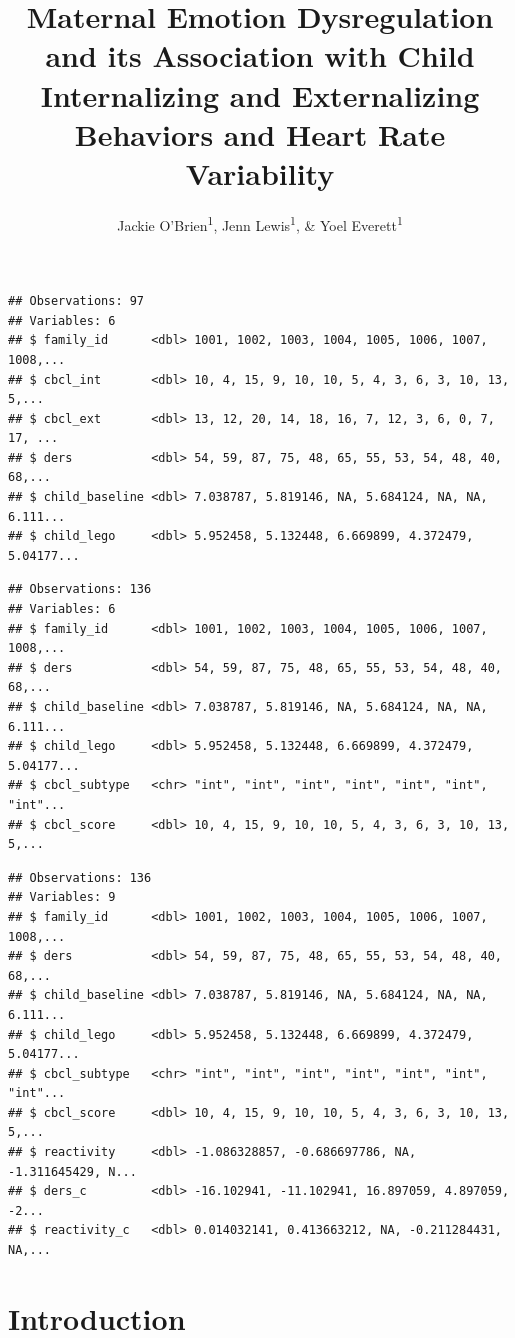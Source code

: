 \documentclass[man]{apa6}
\title{Maternal Emotion Dysregulation and its Association with Child
Internalizing and Externalizing Behaviors and Heart Rate Variability}
\author{Jackie O'Brien\textsuperscript{1}, Jenn Lewis\textsuperscript{1}, \&
Yoel Everett\textsuperscript{1}}
\date{}
\affiliation{
\vspace{0.5cm}
\textsuperscript{1} University of Oregon}
\begin{document}
\maketitle

\begin{verbatim}
## Observations: 97
## Variables: 6
## $ family_id      <dbl> 1001, 1002, 1003, 1004, 1005, 1006, 1007, 1008,...
## $ cbcl_int       <dbl> 10, 4, 15, 9, 10, 10, 5, 4, 3, 6, 3, 10, 13, 5,...
## $ cbcl_ext       <dbl> 13, 12, 20, 14, 18, 16, 7, 12, 3, 6, 0, 7, 17, ...
## $ ders           <dbl> 54, 59, 87, 75, 48, 65, 55, 53, 54, 48, 40, 68,...
## $ child_baseline <dbl> 7.038787, 5.819146, NA, 5.684124, NA, NA, 6.111...
## $ child_lego     <dbl> 5.952458, 5.132448, 6.669899, 4.372479, 5.04177...
\end{verbatim}

\begin{verbatim}
## Observations: 136
## Variables: 6
## $ family_id      <dbl> 1001, 1002, 1003, 1004, 1005, 1006, 1007, 1008,...
## $ ders           <dbl> 54, 59, 87, 75, 48, 65, 55, 53, 54, 48, 40, 68,...
## $ child_baseline <dbl> 7.038787, 5.819146, NA, 5.684124, NA, NA, 6.111...
## $ child_lego     <dbl> 5.952458, 5.132448, 6.669899, 4.372479, 5.04177...
## $ cbcl_subtype   <chr> "int", "int", "int", "int", "int", "int", "int"...
## $ cbcl_score     <dbl> 10, 4, 15, 9, 10, 10, 5, 4, 3, 6, 3, 10, 13, 5,...
\end{verbatim}

\begin{verbatim}
## Observations: 136
## Variables: 9
## $ family_id      <dbl> 1001, 1002, 1003, 1004, 1005, 1006, 1007, 1008,...
## $ ders           <dbl> 54, 59, 87, 75, 48, 65, 55, 53, 54, 48, 40, 68,...
## $ child_baseline <dbl> 7.038787, 5.819146, NA, 5.684124, NA, NA, 6.111...
## $ child_lego     <dbl> 5.952458, 5.132448, 6.669899, 4.372479, 5.04177...
## $ cbcl_subtype   <chr> "int", "int", "int", "int", "int", "int", "int"...
## $ cbcl_score     <dbl> 10, 4, 15, 9, 10, 10, 5, 4, 3, 6, 3, 10, 13, 5,...
## $ reactivity     <dbl> -1.086328857, -0.686697786, NA, -1.311645429, N...
## $ ders_c         <dbl> -16.102941, -11.102941, 16.897059, 4.897059, -2...
## $ reactivity_c   <dbl> 0.014032141, 0.413663212, NA, -0.211284431, NA,...
\end{verbatim}

\section{Introduction}\label{introduction}
\end{document}
